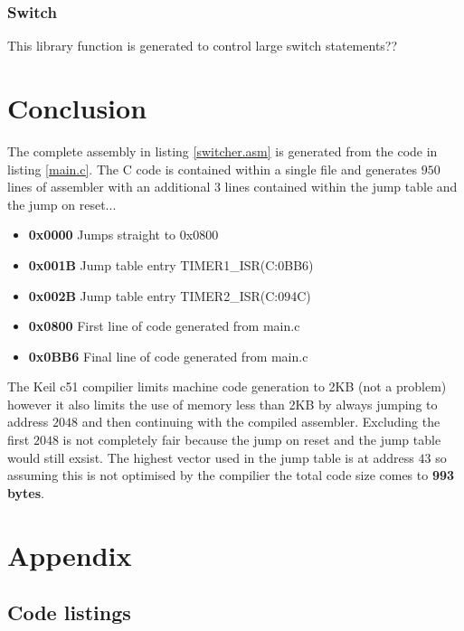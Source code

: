 \documentclass[12pt]{article}%
\begin{document}
\subsubsection{Switch}

This library function is generated to control large switch statements??

\section{Conclusion}

The complete assembly in listing \ref{switcher.asm} is generated from the code in listing \ref{main.c}. The C code is contained within a single file and generates $950$ lines of assembler with an additional $3$ lines contained within the jump table and the jump on reset...

\begin{itemize}
  	\item \textbf{0x0000} Jumps straight to 0x0800
	\item \textbf{0x001B} Jump table entry TIMER1\_ISR(C:0BB6)
	\item \textbf{0x002B} Jump table entry TIMER2\_ISR(C:094C)
	\item \textbf{0x0800} First line of code generated from main.c
  	\item \textbf{0x0BB6} Final line of code generated from main.c
\end{itemize}

The Keil c51 compilier limits machine code generation to 2KB (not a problem) however it also limits the use of memory less than 2KB by always jumping to address $2048$ and then continuing with the compiled assembler. Excluding the first $2048$ is not completely fair because the jump on reset and the jump table would still exsist. The highest vector used in the jump table is at address $43$ so assuming this is not optimised by the compilier the total code size comes to \textbf{993 bytes}.

\section{Appendix}

\subsection{Code listings}


\end{document}
